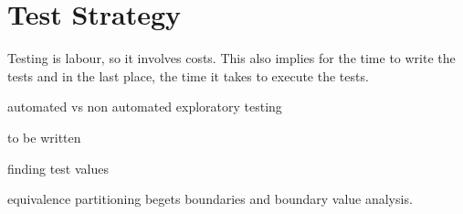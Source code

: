 \documentclass[\docroot/main]{subfiles}
\begin{document}
\chapter{Test Strategy}
Testing is labour, so it involves costs. This also implies for the
time to write the tests and in the last place, the time it takes to
execute the tests. 


automated vs non automated
exploratory testing 

to be written

finding test values


equivalence partitioning begets boundaries and boundary value
analysis.
\end{document}
